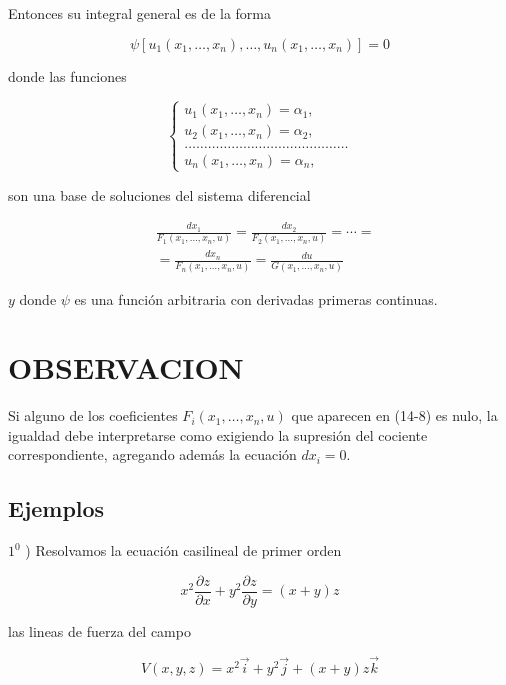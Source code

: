 \documentclass[10pt]{article}
\theoremstyle{plain}
\theoremstyle{definition}
\theoremstyle{remark}
\begin{document}
Entonces su integral general es de la forma

$$
\psi\left[u_{1}\left(x_{1}, \ldots, x_{n}\right), \ldots, u_{n}\left(x_{1}, \ldots, x_{n}\right)\right]=0
$$

donde las funciones


$$
\left\{\begin{array}{l}
u_{1}\left(x_{1}, \ldots, x_{n}\right)=\alpha_{1}, \\
u_{2}\left(x_{1}, \ldots, x_{n}\right)=\alpha_{2}, \\
\ldots \ldots \ldots \ldots \ldots \ldots \ldots \ldots \ldots \ldots \ldots \ldots \ldots \ldots \\
u_{n}\left(x_{1}, \ldots, x_{n}\right)=\alpha_{n},
\end{array}\right.
$$

son una base de soluciones del sistema diferencial


\begin{align*}
& \frac{d x_{1}}{F_{1}\left(x_{1}, \ldots, x_{n}, u\right)}=\frac{d x_{2}}{F_{2}\left(x_{1}, \ldots, x_{n}, u\right)}=\cdots= \\
& =\frac{d x_{n}}{F_{n}\left(x_{1}, \ldots, x_{n}, u\right)}=\frac{d u}{G\left(x_{1}, \ldots, x_{n}, u\right)} \tag{14-8}
\end{align*}


$y$ donde $\psi$ es una función arbitraria con derivadas primeras continuas.

\section*{OBSERVACION}
Si alguno de los coeficientes $F_{i}\left(x_{1}, \ldots, x_{n}, u\right)$ que aparecen en (14-8) es nulo, la igualdad debe interpretarse como exigiendo la supresión del cociente correspondiente, agregando además la ecuación $d x_{i}=0$.

\subsection{Ejemplos}
$1^{0}$ ) Resolvamos la ecuación casilineal de primer orden


\begin{equation*}
x^{2} \frac{\partial z}{\partial x}+y^{2} \frac{\partial z}{\partial y}=(x+y) z \tag{14-9}
\end{equation*}


las lineas de fuerza del campo

$$
V(x, y, z)=x^{2} \vec{i}+y^{2} \vec{j}+(x+y) z \vec{k}
$$
\end{document}
